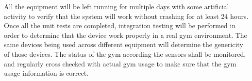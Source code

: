 \documentclass[ppfs.tex]{template/subfiles}
\begin{document}
All the equipment will be left running for multiple days with some artificial activity to verify that the system will work without crashing for at least 24 hours.
Once all the unit tests are completed, integration testing will be performed in order to determine that the device work properly in a real gym environment. The same devices being used across different equipment will determine the genericity of those devices. The status of the gym according the sensors shall be monitored, and regularly cross checked with actual gym usage to make sure that the gym usage information is correct. 
\end{document}
